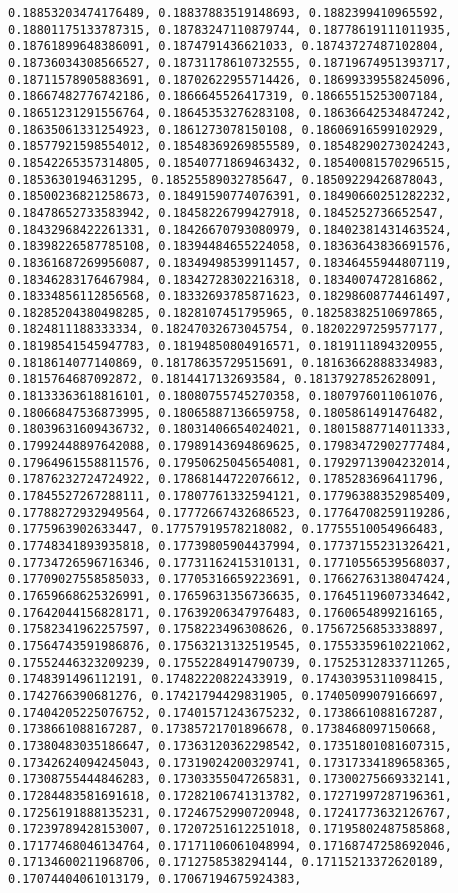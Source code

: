 \documentclass[11pt]{article}
\begin{document}
\begin{Verbatim}[commandchars=\\\{\}]
0.18853203474176489, 0.18837883519148693, 0.1882399410965592, 0.18801175133787315, 0.18783247110879744, 0.18778619111011935, 0.18761899648386091, 0.1874791436621033, 0.18743727487102804, 0.18736034308566527, 0.18731178610732555, 0.18719674951393717, 0.18711578905883691, 0.18702622955714426, 0.18699339558245096, 0.18667482776742186, 0.1866645526417319, 0.18665515253007184, 0.18651231291556764, 0.18645353276283108, 0.18636642534847242, 0.18635061331254923, 0.1861273078150108, 0.18606916599102929, 0.18577921598554012, 0.18548369269855589, 0.18548290273024243, 0.18542265357314805, 0.18540771869463432, 0.18540081570296515, 0.1853630194631295, 0.18525589032785647, 0.18509229426878043, 0.18500236821258673, 0.18491590774076391, 0.18490660251282232, 0.18478652733583942, 0.18458226799427918, 0.1845252736652547, 0.18432968422261331, 0.18426670793080979, 0.18402381431463524, 0.18398226587785108, 0.18394484655224058, 0.18363643836691576, 0.18361687269956087, 0.18349498539911457, 0.18346455944807119, 0.18346283176467984, 0.18342728302216318, 0.1834007472816862, 0.18334856112856568, 0.18332693785871623, 0.18298608774461497, 0.18285204380498285, 0.1828107451795965, 0.18258382510697865, 0.1824811188333334, 0.18247032673045754, 0.18202297259577177, 0.18198541545947783, 0.18194850804916571, 0.1819111894320955, 0.1818614077140869, 0.18178635729515691, 0.18163662888334983, 0.1815764687092872, 0.1814417132693584, 0.18137927852628091, 0.18133363618816101, 0.18080755745270358, 0.1807976011061076, 0.18066847536873995, 0.18065887136659758, 0.1805861491476482, 0.18039631609436732, 0.18031406654024021, 0.18015887714011333, 0.17992448897642088, 0.17989143694869625, 0.17983472902777484, 0.17964961558811576, 0.17950625045654081, 0.17929713904232014, 0.17876232724724922, 0.17868144722076612, 0.1785283696411796, 0.17845527267288111, 0.17807761332594121, 0.17796388352985409, 0.17788272932949564, 0.17772667432686523, 0.17764708259119286, 0.1775963902633447, 0.17757919578218082, 0.17755510054966483, 0.17748341893935818, 0.17739805904437994, 0.17737155231326421, 0.17734726596716346, 0.17731162415310131, 0.17710556539568037, 0.17709027558585033, 0.17705316659223691, 0.17662763138047424, 0.17659668625326991, 0.17659631356736635, 0.17645119607334642, 0.17642044156828171, 0.17639206347976483, 0.1760654899216165, 0.17582341962257597, 0.1758223496308626, 0.17567256853338897, 0.17564743591986876, 0.17563213132519545, 0.17553359610221062, 0.17552446323209239, 0.17552284914790739, 0.17525312833711265, 0.1748391496112191, 0.17482220822433919, 0.17430395311098415, 0.1742766390681276, 0.17421794429831905, 0.17405099079166697, 0.17404205225076752, 0.17401571243675232, 0.1738661088167287, 0.1738661088167287, 0.17385721701896678, 0.1738468097150668, 0.17380483035186647, 0.17363120362298542, 0.17351801081607315, 0.17342624094245043, 0.17319024200329741, 0.17317334189658365, 0.17308755444846283, 0.17303355047265831, 0.17300275669332141, 0.17284483581691618, 0.17282106741313782, 0.17271997287196361, 0.17256191888135231, 0.17246752990720948, 0.17241773632126767, 0.17239789428153007, 0.17207251612251018, 0.17195802487585868, 0.17177468046134764, 0.17171106061048994, 0.17168747258692046, 0.17134600211968706, 0.1712758538294144, 0.17115213372620189, 0.17074404061013179, 0.17067194675924383, 
\end{Verbatim}
\end{document}
